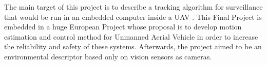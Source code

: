

The main target of this project is to describe a tracking algorithm for surveillance that would be run in an embedded computer inside a UAV \cite{Image_processing_UAV}.  This Final Project is embedded in a huge European Project whose proposal is to develop motion estimation and control method for Unmanned Aerial Vehicle in order to increase the reliability and safety of these systems. Afterwards, the project aimed to be an environmental descriptor based only on vision sensors as cameras. \\


 
